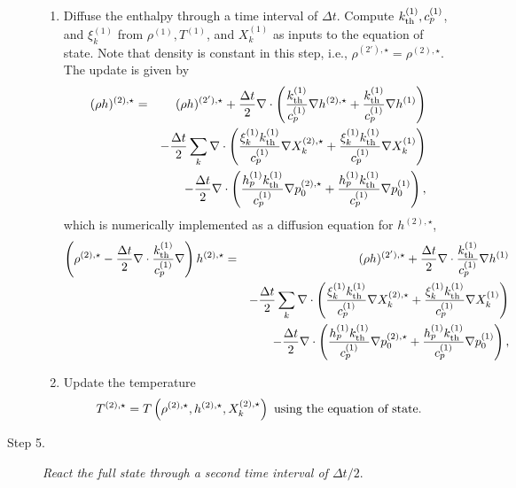 \documentclass[11pt]{article}
\newcommand{\kth}{k_{\rm th}}
\newcommand{\dt}{\Delta t}
\begin{document}
\begin{description}
\begin{enumerate}
\item Diffuse the enthalpy through a time interval of $\dt$.  Compute $\kth^{(1)}, c_p^{(1)}$, and $\xi_k^{(1)}$ from $\rho^{(1)}, T^{(1)}$, and $X_k^{(1)}$ as inputs to the equation of state.  Note that density is constant in this step, i.e., $\rho^{(2'),\star}=\rho^{(2),\star}$.  The update is given by
\begin{eqnarray}
(\rho h)^{(2),\star} &=& (\rho h)^{(2'),\star} + \frac{\dt}{2}\nabla\cdot\left(\frac{\kth^{(1)}}{c_p^{(1)}}\nabla h^{(2),\star} + \frac{\kth^{(1)}}{c_p^{(1)}}\nabla h^{(1)}\right)\nonumber\\
&&- \frac{\dt}{2}\sum_k\nabla\cdot\left(\frac{\xi_k^{(1)}\kth^{(1)}}{c_p^{(1)}}\nabla X_k^{(2),\star} + \frac{\xi_k^{(1)}\kth^{(1)}}{c_p^{(1)}}\nabla X_k^{(1)}\right)\nonumber\\
&&- \frac{\dt}{2}\nabla\cdot\left(\frac{h_p^{(1)}\kth^{(1)}}{c_p^{(1)}}\nabla p_0^{(2),\star} + \frac{h_p^{(1)}\kth^{(1)}}{c_p^{(1)}}\nabla p_0^{(1)}\right),
\end{eqnarray}
which is numerically implemented as a diffusion equation for $h^{(2),\star}$,
\begin{eqnarray}
\left(\rho^{(2),\star} - \frac{\dt}{2}\nabla\cdot\frac{\kth^{(1)}}{c_p^{(1)}}\nabla\right)h^{(2),\star} &=& (\rho h)^{(2'),\star} + \frac{\dt}{2}\nabla\cdot\frac{\kth^{(1)}}{c_p^{(1)}}\nabla h^{(1)}\nonumber\\
&&- \frac{\dt}{2}\sum_k\nabla\cdot\left(\frac{\xi_k^{(1)}\kth^{(1)}}{c_p^{(1)}}\nabla X_k^{(2),\star} + \frac{\xi_k^{(1)}\kth^{(1)}}{c_p^{(1)}}\nabla X_k^{(1)}\right)\nonumber\\
&&- \frac{\dt}{2}\nabla\cdot\left(\frac{h_p^{(1)}\kth^{(1)}}{c_p^{(1)}}\nabla p_0^{(2),\star} + \frac{h_p^{(1)}\kth^{(1)}}{c_p^{(1)}}\nabla p_0^{(1)}\right),
\end{eqnarray}
\item Update the temperature
\begin{equation}
T^{(2),\star} = T\left(\rho^{(2),\star}, h^{(2),\star}, X_k^{(2),\star}\right) {\hbox{ \rm using the equation of state.}}
\end{equation}

\end{enumerate}

\item[Step 5.] {\em React the full state through a second time interval of $\dt / 2.$}


\end{description}
\end{document}
